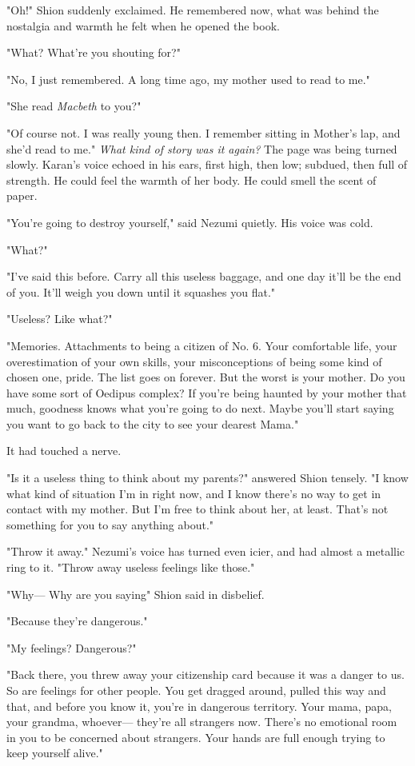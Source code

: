 "Oh!" Shion suddenly exclaimed. He remembered now, what was behind the
nostalgia and warmth he felt when he opened the book.

"What? What're you shouting for?"

"No, I just remembered. A long time ago, my mother used to read to me."

"She read \emph{Macbeth} to you?"

"Of course not. I was really young then. I remember sitting in Mother's
lap, and she'd read to me." \emph{What kind of story was it again?} The page
was being turned slowly. Karan's voice echoed in his ears, first high,
then low; subdued, then full of strength. He could feel the warmth of
her body. He could smell the scent of paper.

"You're going to destroy yourself," said Nezumi quietly. His voice was
cold.

"What?"

"I've said this before. Carry all this useless baggage, and one day
it'll be the end of you. It'll weigh you down until it squashes you
flat."

"Useless? Like what?"

"Memories. Attachments to being a citizen of No. 6. Your comfortable
life, your overestimation of your own skills, your misconceptions of
being some kind of chosen one, pride. The list goes on forever. But the
worst is your mother. Do you have some sort of Oedipus complex? If
you're being haunted by your mother that much, goodness knows what
you're going to do next. Maybe you'll start saying you want to go back
to the city to see your dearest Mama."

It had touched a nerve.

"Is it a useless thing to think about my parents?" answered Shion
tensely. "I know what kind of situation I'm in right now, and I know
there's no way to get in contact with my mother. But I'm free to think
about her, at least. That's not something for you to say anything
about."

"Throw it away." Nezumi's voice has turned even icier, and had almost a
metallic ring to it. "Throw away useless feelings like those."

"Why--- Why are you saying\el " Shion said in disbelief.

"Because they're dangerous."

"My feelings? Dangerous?"

"Back there, you threw away your citizenship card because it was a
danger to us. So are feelings for other people. You get dragged around,
pulled this way and that, and before you know it, you're in dangerous
territory. Your mama, papa, your grandma, whoever--- they're all strangers
now. There's no emotional room in you to be concerned about strangers.
Your hands are full enough trying to keep yourself alive."

